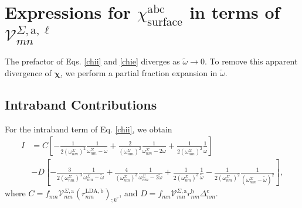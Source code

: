 \documentclass[letterpaper,aps]{revtex4}
\begin{document}

\section{Expressions for 
\texorpdfstring{$\chi_{\mathrm{surface}}^{\mathrm{abc}}$}{Xabc} in terms of
\texorpdfstring{$\mathcal{V}^{\Sigma,\text{a},\ell}_{mn}$}{Vmn}}
\label{appv}

The prefactor of Eqs. \eqref{chii} and \eqref{chie} diverges as $\tilde\omega\to
0$. To remove this apparent divergence of $\boldsymbol{\chi}$, we perform a
partial fraction expansion in $\tilde\omega$.



\subsection{Intraband Contributions}

For the intraband term of Eq. \eqref{chii}, we obtain
\begin{align}\label{pfinn} 
I&= 
C
\left[
-\frac{1}{2(\omega^\Sigma_{nm})^2}\frac{1}{\omega^\Sigma_{nm}-\tilde\omega}
+\frac{2}{(\omega^\Sigma_{nm})^2}\frac{1}{\omega^\Sigma_{nm}-2\tilde\omega}
+\frac{1}{2(\omega^\Sigma_{nm})^2}\frac{1}{\tilde\omega}
\right]
\nonumber\\
&-D
\left[
-\frac{3}{2(\omega^\Sigma_{nm})^3}\frac{1}{\omega^\Sigma_{nm}-\tilde\omega}
+\frac{4}{(\omega^\Sigma_{nm})^3}\frac{1}{\omega^\Sigma_{nm}-2\tilde\omega}
+\frac{1}{2(\omega^\Sigma_{nm})^3}\frac{1}{\tilde\omega}
-\frac{1}{2(\omega^\Sigma_{nm})^2}\frac{1}{(\omega^\Sigma_{nm}-\tilde\omega)^2}
\right]
,
\end{align} 
where $C = f_{mn}\mathcal{V}^{\Sigma,\mathrm{a}}_{mn}
(r^{\mathrm{LDA},\mathrm{b}}_{nm})_{;k^{\mathrm{c}}}$, and $D =
f_{mn}\mathcal{V}^{\Sigma,\mathrm{a}}_{mn}
r^{\mathrm{b}}_{nm}\Delta^{\mathrm{c}}_{nm}$.
\end{document}
